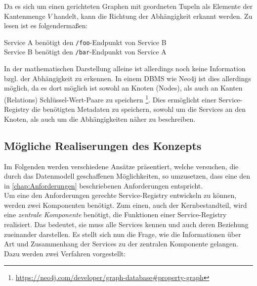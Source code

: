 \documentclass[
	12pt,
	BCOR=5mm,
	DIV=12,
	headinclude=on,
	footinclude=off,
	parskip=half,
	bibliography=totoc,
	listof=entryprefix,
	toc=listof,
	numbers=noenddot,
	plainfootsepline
]{scrreprt}
\begin{document}
Da es sich um einen gerichteten Graphen mit geordneten Tupeln als Elemente der Kantenmenge $V$ handelt, kann die Richtung der Abhängigkeit erkannt werden. Zu lesen ist es folgendermaßen:

\begin{center}
	Service A benötigt den \texttt{/foo}-Endpunkt von Service B\\
	Service B benötigt den \texttt{/bar}-Endpunkt von Service A
\end{center}

In der mathematischen Darstellung alleine ist allerdings noch keine Information bzgl. der Abhängigkeit zu erkennen. In einem \ac{DBMS} wie Neo4j ist dies allerdings möglich, da es dort möglich ist sowohl an Knoten (Nodes), als auch an Kanten (Relations) Schlüssel-Wert-Paare zu speichern \footnote{\url{https://neo4j.com/developer/graph-database\#property-graph}}. Dies ermöglicht einer Service-Registry die benötigten Metadaten zu speichern, sowohl um die Services an den Knoten, als auch um die Abhängigkeiten näher zu beschreiben.

\subsection{Mögliche Realiserungen des Konzepts}

Im Folgenden werden verschiedene Ansätze präsentiert, welche versuchen, die durch das Datenmodell geschaffenen Möglichkeiten, so umzusetzen, dass eine den in \vref{chap:Anforderungen} beschriebenen Anforderungen entspricht.\\ Um eine den Anforderungen gerechte Service-Registry entwickeln zu können, werden zwei Komponenten benötigt. Zum einen, auch der Kernbestandteil, wird eine \textit{zentrale Komponente} benötigt, die Funktionen einer Service-Registry realisiert. Das bedeutet, sie muss alle Services kennen und auch deren Beziehung zueinander darstellen. Es stellt sich nun die Frage, wie die Informationen über Art und Zusammenhang der Services zu der zentralen Komponente gelangen. Dazu werden zwei Verfahren vorgestellt:
\end{document}

